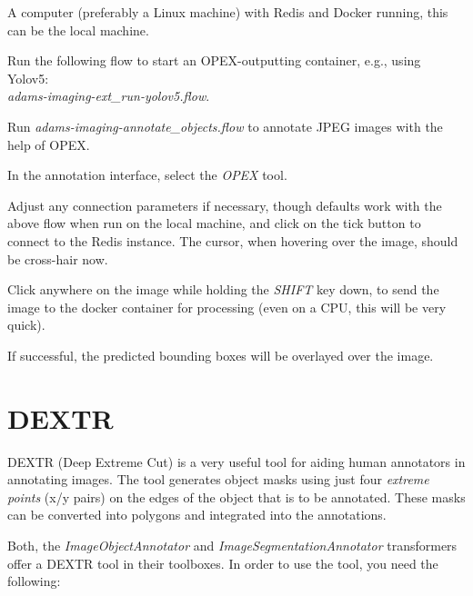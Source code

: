 \documentclass[a4paper]{book}
\begin{document}
\begin{tight_itemize}
  \item A computer (preferably a Linux machine) with Redis\cite{redis} and Docker\cite{docker} running,
  this can be the local machine.
  \item Run the following flow to start an OPEX-outputting container, e.g., using Yolov5: \\
  \textit{adams-imaging-ext\_run-yolov5.flow}.
  \item Run \textit{adams-imaging-annotate\_objects.flow} to annotate JPEG images with the help of OPEX.
  \begin{tight_itemize}
    \item In the annotation interface, select the \textit{OPEX} tool.
    \item Adjust any connection parameters if necessary, though defaults work with the above flow when run on the
    local machine, and click on the tick button to connect to the Redis instance. The cursor, when hovering over
    the image, should be cross-hair now.
    \item Click anywhere on the image while holding the \textit{SHIFT} key down, to send the image to the docker
    container for processing (even on a CPU, this will be very quick).
    \item If successful, the predicted bounding boxes will be overlayed over the image.
  \end{tight_itemize}
\end{tight_itemize}


\newpage
\section{DEXTR}
DEXTR\cite{dextr} (Deep Extreme Cut) is a very useful tool for aiding human annotators in
annotating images. The tool generates object masks using just four \textit{extreme points}
(x/y pairs) on the edges of the object that is to be annotated. These masks can be converted into polygons
and integrated into the annotations.

Both, the \textit{ImageObjectAnnotator} and \textit{ImageSegmentationAnnotator} transformers offer a DEXTR
tool in their toolboxes. In order to use the tool, you need the following:
\end{document}
